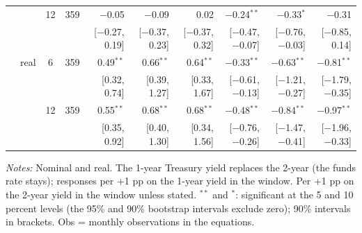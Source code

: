 \begin{longtable}{llcrrrrrrr}
 &  & 12 & 359 & $-$0.05 & $-$0.09 & 0.02 & $-$0.24$^{**}$ & $-$0.33$^{*}$ & $-$0.31\\
 & & & & {\scriptsize [$-$0.27, 0.19]} & {\scriptsize [$-$0.37, 0.23]} & {\scriptsize [$-$0.37, 0.32]} & {\scriptsize [$-$0.47, $-$0.07]} & {\scriptsize [$-$0.76, $-$0.03]} & {\scriptsize [$-$0.85, 0.14]}\\
 & real & 6 & 359 & 0.49$^{**}$ & 0.66$^{**}$ & 0.64$^{**}$ & $-$0.33$^{**}$ & $-$0.63$^{**}$ & $-$0.81$^{**}$\\
 & & & & {\scriptsize [0.32, 0.74]} & {\scriptsize [0.39, 1.27]} & {\scriptsize [0.33, 1.67]} & {\scriptsize [$-$0.61, $-$0.13]} & {\scriptsize [$-$1.21, $-$0.27]} & {\scriptsize [$-$1.79, $-$0.35]}\\
 &  & 12 & 359 & 0.55$^{**}$ & 0.68$^{**}$ & 0.68$^{**}$ & $-$0.48$^{**}$ & $-$0.84$^{**}$ & $-$0.97$^{**}$\\
 & & & & {\scriptsize [0.35, 0.92]} & {\scriptsize [0.40, 1.30]} & {\scriptsize [0.34, 1.56]} & {\scriptsize [$-$0.76, $-$0.26]} & {\scriptsize [$-$1.47, $-$0.41]} & {\scriptsize [$-$1.96, $-$0.33]}\\
\end{longtable}
\begin{flushleft}\footnotesize\textit{Notes:} Nominal and real. The 1-year Treasury yield replaces the 2-year (the funds rate stays); responses per +1 pp on the 1-year yield in the window. Per +1 pp on the 2-year yield in the window unless stated. $^{**}$ and $^{*}$: significant at the 5 and 10 percent levels (the 95\% and 90\% bootstrap intervals exclude zero); 90\% intervals in brackets. Obs = monthly observations in the equations.\end{flushleft}
\endgroup

